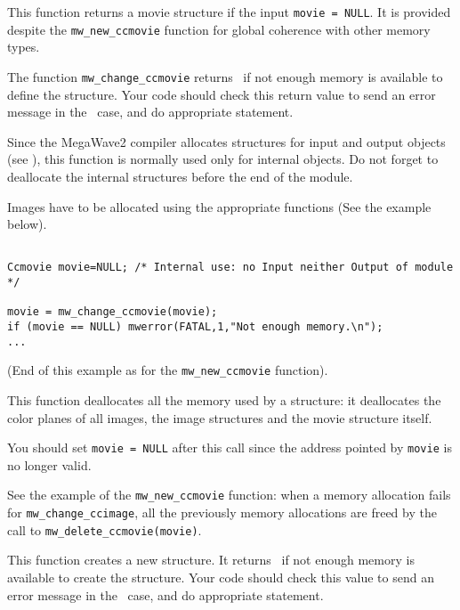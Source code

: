 \Description
This function returns a movie structure if the input \verb+movie = NULL+.
It is provided despite the \verb+mw_new_ccmovie+ function for
global coherence with other memory types.

The function \verb+mw_change_ccmovie+ returns \Null\ if not enough memory is available to define the structure. Your code should check this return value to 
send an error message in the \Null\ case, and do appropriate statement.

Since the MegaWave2 compiler allocates structures for input and output 
objects (see \volI), this function is normally used only for internal objects.
Do not forget to deallocate the internal structures before the end
of the module.

Images have to be allocated using the appropriate functions (See the example
below).

\Next
\Example
\begin{verbatim}

Ccmovie movie=NULL; /* Internal use: no Input neither Output of module */

movie = mw_change_ccmovie(movie);
if (movie == NULL) mwerror(FATAL,1,"Not enough memory.\n");
...
\end{verbatim}
(End of this example as for the \verb+mw_new_ccmovie+ function).
\newpage %


\Description
This function deallocates all the memory used by a \ccmovie structure:
it deallocates the color planes of all images, the image structures and
the movie structure itself.

You should set \verb+movie = NULL+ after this call since the address pointed
by \verb+movie+ is no longer valid.

\Next
\Example
See the example of the \verb+mw_new_ccmovie+ function: when a memory allocation
fails for \verb+mw_change_ccimage+, all the previously memory allocations are
freed by the call to \verb+mw_delete_ccmovie(movie)+.

\newpage %


\Description
This function creates a new \ccmovie structure.
It returns \Null\ if not enough memory is available to create the structure.
Your code should check this value to send an
error message in the \Null\ case, and do appropriate statement.


